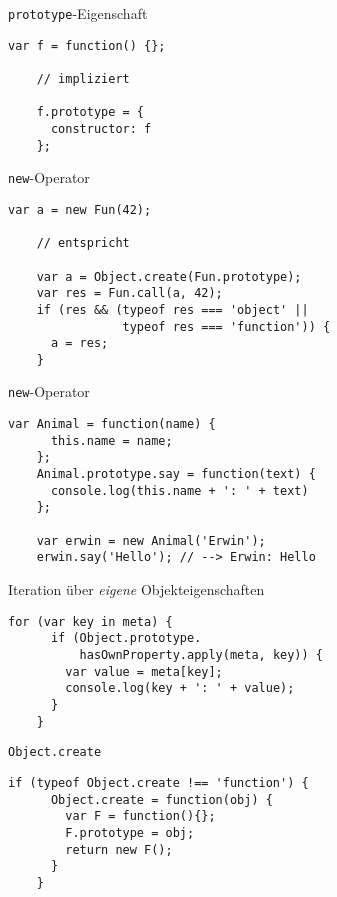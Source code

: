 \begin{frame}[fragile]{\lstinline-prototype--Eigenschaft}
  \begin{lstlisting}[gobble=4]
    var f = function() {};
    
    // impliziert
    
    f.prototype = {
      constructor: f
    };
  \end{lstlisting}
\end{frame}

\begin{frame}[fragile]{\lstinline-new--Operator}
  \begin{lstlisting}[gobble=4]
    var a = new Fun(42);

    // entspricht  
  
    var a = Object.create(Fun.prototype);
    var res = Fun.call(a, 42);
    if (res && (typeof res === 'object' ||
                typeof res === 'function')) {
      a = res;
    }
  \end{lstlisting}
\end{frame}

\begin{frame}[fragile]{\lstinline-new--Operator}
  \begin{lstlisting}[gobble=4]
    var Animal = function(name) {
      this.name = name;
    };
    Animal.prototype.say = function(text) {
      console.log(this.name + ': ' + text)
    };
    
    var erwin = new Animal('Erwin');
    erwin.say('Hello'); // --> Erwin: Hello
  \end{lstlisting}
\end{frame}

\begin{frame}[fragile]{Iteration über \emph{eigene} Objekteigenschaften}
  \begin{lstlisting}[gobble=4]
    for (var key in meta) {
      if (Object.prototype.
          hasOwnProperty.apply(meta, key)) {
        var value = meta[key];
        console.log(key + ': ' + value);
      }
    }
  \end{lstlisting}
\end{frame}

\begin{frame}[fragile]{\lstinline-Object.create-}
  \begin{lstlisting}[gobble=4]
    if (typeof Object.create !== 'function') {
      Object.create = function(obj) {
        var F = function(){};
        F.prototype = obj;
        return new F();
      }
    }
  \end{lstlisting}  
\end{frame}

